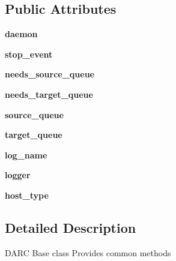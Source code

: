 \subsection*{Public Attributes}
\begin{DoxyCompactItemize}
\item 
\mbox{\label{classdarc_1_1base_1_1_d_a_r_c_base_a3a898fab4560eed23d9e5557bcd98e75}} 
{\bfseries daemon}
\item 
\mbox{\label{classdarc_1_1base_1_1_d_a_r_c_base_ab8e031789367ce2d0a343b42e5a6c3c1}} 
{\bfseries stop\+\_\+event}
\item 
\mbox{\label{classdarc_1_1base_1_1_d_a_r_c_base_a462eb39701dcd45666a00fd2f2f9721c}} 
{\bfseries needs\+\_\+source\+\_\+queue}
\item 
\mbox{\label{classdarc_1_1base_1_1_d_a_r_c_base_a4efeb88851c70449c5139c3cc88b2df0}} 
{\bfseries needs\+\_\+target\+\_\+queue}
\item 
\mbox{\label{classdarc_1_1base_1_1_d_a_r_c_base_a382fa5f9275a39032ce14a75ae8d4b73}} 
{\bfseries source\+\_\+queue}
\item 
\mbox{\label{classdarc_1_1base_1_1_d_a_r_c_base_afb8c87f6c2241631a7aa2244ace8a4a7}} 
{\bfseries target\+\_\+queue}
\item 
\mbox{\label{classdarc_1_1base_1_1_d_a_r_c_base_a9838a4486faccf60defa74b0a7de0f77}} 
{\bfseries log\+\_\+name}
\item 
\mbox{\label{classdarc_1_1base_1_1_d_a_r_c_base_a1745af7a4c3106c6f5ac743a4df3e071}} 
{\bfseries logger}
\item 
\mbox{\label{classdarc_1_1base_1_1_d_a_r_c_base_a7d3b111c41584b8eb32838dd05f936f7}} 
{\bfseries host\+\_\+type}
\end{DoxyCompactItemize}


\subsection{Detailed Description}
\begin{DoxyVerb}DARC Base class
Provides common methods
\end{DoxyVerb}
 

